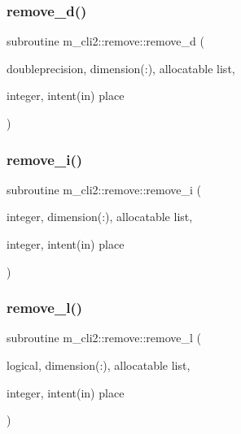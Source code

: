 \mbox{\label{interfacem__cli2_1_1remove_a0d123599053c144f5ab233b735a38f1d}} 
\subsubsection{\texorpdfstring{remove\+\_\+d()}{remove\_d()}}
{\footnotesize\ttfamily subroutine m\+\_\+cli2\+::remove\+::remove\+\_\+d (\begin{DoxyParamCaption}\item[{doubleprecision, dimension(\+:), allocatable}]{list,  }\item[{integer, intent(in)}]{place }\end{DoxyParamCaption})\hspace{0.3cm}{\ttfamily [private]}}

\mbox{\label{interfacem__cli2_1_1remove_a4a30f737b41e6cfca58ef2842d633b27}} 
\subsubsection{\texorpdfstring{remove\+\_\+i()}{remove\_i()}}
{\footnotesize\ttfamily subroutine m\+\_\+cli2\+::remove\+::remove\+\_\+i (\begin{DoxyParamCaption}\item[{integer, dimension(\+:), allocatable}]{list,  }\item[{integer, intent(in)}]{place }\end{DoxyParamCaption})\hspace{0.3cm}{\ttfamily [private]}}

\mbox{\label{interfacem__cli2_1_1remove_a72934a0b165dc3d178ff7cbe6117a5b3}} 
\subsubsection{\texorpdfstring{remove\+\_\+l()}{remove\_l()}}
{\footnotesize\ttfamily subroutine m\+\_\+cli2\+::remove\+::remove\+\_\+l (\begin{DoxyParamCaption}\item[{logical, dimension(\+:), allocatable}]{list,  }\item[{integer, intent(in)}]{place }\end{DoxyParamCaption})\hspace{0.3cm}{\ttfamily [private]}}

